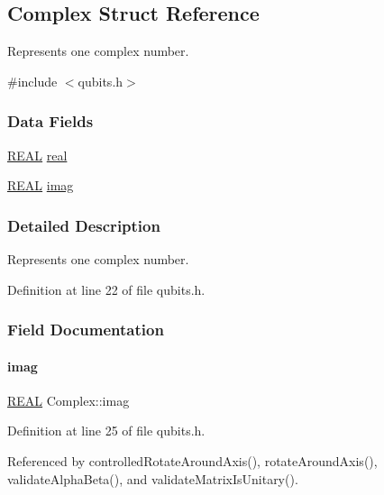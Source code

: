 \hypertarget{structComplex}{}\subsection{Complex Struct Reference}
\label{structComplex}


Represents one complex number.  




{\ttfamily \#include $<$qubits.\+h$>$}

\subsubsection*{Data Fields}
\begin{DoxyCompactItemize}
\item 
\mbox{\hyperlink{precision_8h_a4b654506f18b8bfd61ad2a29a7e38c25}{R\+E\+AL}} \mbox{\hyperlink{structComplex_a479ad939835457595fcca3ca55c06283}{real}}
\item 
\mbox{\hyperlink{precision_8h_a4b654506f18b8bfd61ad2a29a7e38c25}{R\+E\+AL}} \mbox{\hyperlink{structComplex_a1151948284b21c0052f203f23ab931d9}{imag}}
\end{DoxyCompactItemize}


\subsubsection{Detailed Description}
Represents one complex number. 

Definition at line 22 of file qubits.\+h.



\subsubsection{Field Documentation}
\mbox{\label{structComplex_a1151948284b21c0052f203f23ab931d9}} 
\paragraph{\texorpdfstring{imag}{imag}}
{\footnotesize\ttfamily \mbox{\hyperlink{precision_8h_a4b654506f18b8bfd61ad2a29a7e38c25}{R\+E\+AL}} Complex\+::imag}



Definition at line 25 of file qubits.\+h.



Referenced by controlled\+Rotate\+Around\+Axis(), rotate\+Around\+Axis(), validate\+Alpha\+Beta(), and validate\+Matrix\+Is\+Unitary().

